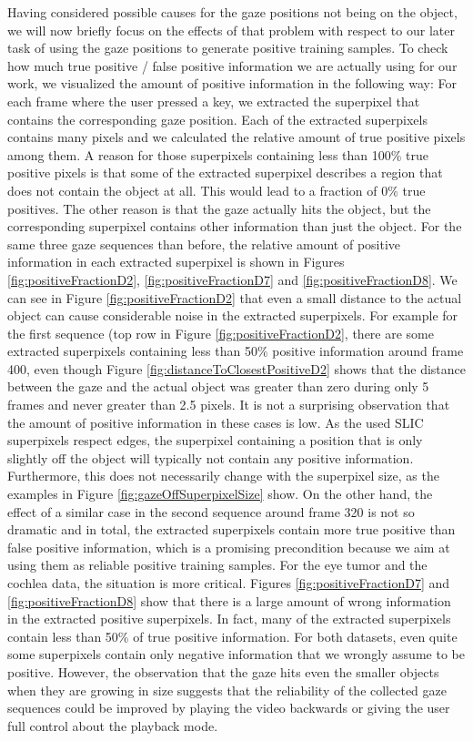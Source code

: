Having considered possible causes for the gaze positions not being on the object, we will now briefly focus on the effects of that problem with respect to our later task of using the gaze positions to generate positive training samples. 
To check how much true positive / false positive information we are actually using for our work, we visualized the amount of positive information in the following way: 
For each frame where the user pressed a key, we extracted the superpixel that contains the corresponding gaze position. 
Each of the extracted superpixels contains many pixels and we calculated the relative amount of true positive pixels among them. 
A reason for those superpixels containing less than 100\% true positive pixels is that some of the extracted superpixel describes a region that does not contain the object at all. 
This would lead to a fraction of 0\% true positives. 
The other reason is that the gaze actually hits the object, but the corresponding superpixel contains other information than just the object. 
For the same three gaze sequences than before, the relative amount of positive information in each extracted superpixel is shown in Figures \ref{fig:positiveFractionD2}, \ref{fig:positiveFractionD7} and \ref{fig:positiveFractionD8}. 
We can see in Figure \ref{fig:positiveFractionD2} that even a small distance to the actual object can cause considerable noise in the extracted superpixels. 
For example for the first sequence (top row in Figure \ref{fig:positiveFractionD2}, there are some extracted superpixels containing less than 50\% positive information around frame 400, even though Figure \ref{fig:distanceToClosestPositiveD2} shows that the distance between the gaze and the actual object was greater than zero during only 5 frames and never greater than 2.5 pixels. 
It is not a surprising observation that the amount of positive information in these cases is low. As the used SLIC superpixels respect edges, the superpixel containing a position that is only slightly off the object will typically not contain any positive information. Furthermore, this does not necessarily change with the superpixel size, as the examples in Figure \ref{fig:gazeOffSuperpixelSize} show. On the other hand, the effect of a similar case in the second sequence around frame 320 is not so dramatic and in total, the extracted superpixels contain more true positive than false positive information, which is a promising precondition because we aim at using them as reliable positive training samples. 
For the eye tumor and the cochlea data, the situation is more critical. Figures \ref{fig:positiveFractionD7} and \ref{fig:positiveFractionD8} show that there is a large amount of wrong information in the extracted positive superpixels. In fact, many of the extracted superpixels contain less than 50\% of true positive information. For both datasets, even quite some superpixels contain only negative information that we wrongly assume to be positive. 
However, the observation that the gaze hits even the smaller objects when they are growing in size suggests that the reliability of the collected gaze sequences could be improved by playing the video backwards or giving the user full control about the playback mode.


